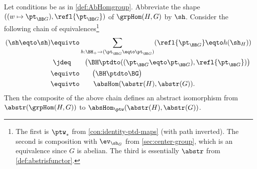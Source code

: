 \begin{lemma}\label{lem:grpHomOK}
Let conditions be as in \cref{def:AbHomgroup}. Abbreviate the shape
$((w\mapsto \pt_{\BB G}),\refl{\pt_{\BB G}})$ of $\grpHom(H,G)$ by $\sh$. 
Consider the following chain of equivalences\footnote{%
The first is $\ptw_*$ from \cref{con:identity-ptd-maps} 
(with path inverted). 
The second is composition with $\ev_{\sh_G}$
from \cref{sec:center-group}, which is an equivalence since $G$ is abelian.
The third is essentially $\abstr$ from \cref{def:abstrisfunctor}.}
\begin{align*}
(\sh\eqto\sh) &\equivto 
\sum_{h:\BH_\div\to(\pt_{\BB G}\eqto\pt_{\BB G})} 
  (\refl{\pt_{\BB G}}\eqto h(\sh_H)) \\
              &~\jdeq \qquad \bigl(\BH\ptdto((\pt_{\BB G}\eqto\pt_{\BB G}),\refl{\pt_{\BB G}})\bigr)\\
 &\equivto \qquad\! \bigl(\BH\ptdto\BG\bigr)\\
 &\equivto \qquad \absHom(\abstr(H),\abstr(G)).
\end{align*}
Then the composite of the above chain defines an abstract isomorphism
from $\abstr(\grpHom(H,G))$ to $\absHom_{\ptw}(\abstr(H),\abstr(G))$.
\end{lemma}
